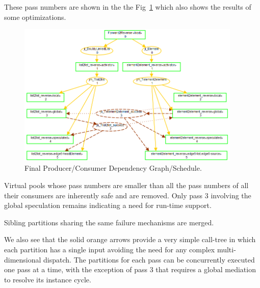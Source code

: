 \documentclass{llncs}
\begin{document}
These pass numbers are shown in the the Fig~\ref{fig:FinalSchedule} which also shows the results of some optimizations.

\begin{figure}[h]
	\centering
	\includegraphics[width=0.95\textwidth]{FinalSchedule.png}
	\caption{Final Producer/Consumer Dependency Graph/Schedule.}
	\label{fig:FinalSchedule}
\end{figure}


Virtual pools whose pass numbers are smaller than all the pass numbers of all their consumers are inherently safe and are removed. Only pass 3 involving the global speculation remains indicating a need for run-time support.

Sibling partitions sharing the same failure mechanisms are merged.



We also see that the solid orange arrows provide a very simple call-tree in which each partition has a single input avoiding the need for any complex multi-dimensional dispatch. The partitions for each pass can be concurrently executed one pass at a time, with the exception of pass 3 that requires a global mediation to resolve its instance cycle.

\end{document}
